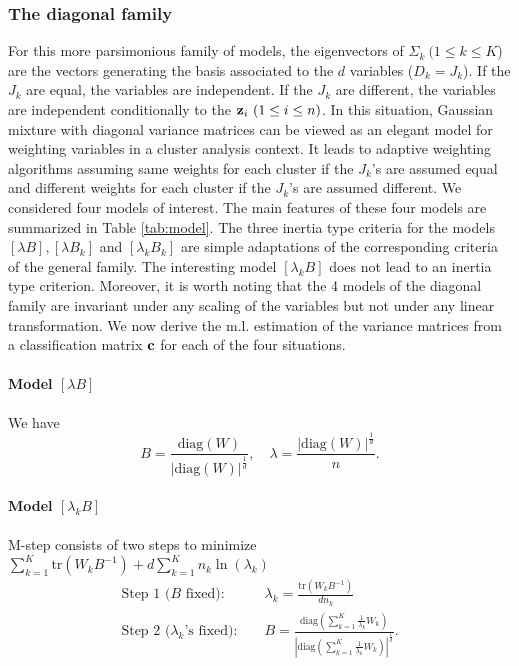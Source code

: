 \documentclass[12pt]{article}
\begin{document}
\subsubsection{The diagonal family}
For this more parsimonious family of models, the eigenvectors of $\Sigma_{k}\ (1 \leq k \leq
K$) are the vectors generating the basis associated to the $d$ variables ($D_k=J_k$).  If the
$J_k$ are equal, the variables are independent. If the $J_k$ are different, the variables are
independent conditionally to the ${\bf z}_{i} \ (1 \leq i \leq n)$.  In this situation,
Gaussian mixture with diagonal variance matrices can be viewed as an elegant model for
weighting variables in a cluster analysis context.  It leads to adaptive weighting algorithms
assuming same weights for each cluster if the $J_k$'s are assumed equal and different weights
for each cluster if the $J_k$'s are assumed different. We considered four models of interest.
The main features of these four models are summarized in Table \ref{tab:model}. The three
inertia type criteria for the models $[\lambda B], [\lambda B_k]$ and $[\lambda_k B_k]$ are
simple adaptations of the corresponding criteria of the general family.  The interesting model
$[\lambda_kB]$ does not lead to an inertia type criterion. Moreover, it is worth noting that
the 4 models of the diagonal family are invariant under any scaling of the variables but not
under any linear transformation. We now derive the m.l. estimation of the variance matrices from
a classification matrix ${\bf c}$ for each of the four situations.

\paragraph{Model $[\lambda B]$}
We have
\begin{equation}
  B=\frac{\mbox{diag}(W)} {|\mbox{diag}(W)|^{\frac{1}{d}}}, \quad
  \lambda=\frac {|\mbox{diag}(W)|^{\frac{1}{d}}}{n}.
\end{equation}

\paragraph{Model $[\lambda_k B]$}
M-step consists of two steps to minimize $\sum_{k=1}^{K} \mbox{tr} (W_k
B^{-1}) + d \sum_{k=1}^{K} n_k \ln(\lambda_k)$
\begin{eqnarray}
  \mbox{Step 1 ($B$ fixed): } & & \lambda_k=\frac{\mbox{tr}(W_kB^{-1})}{dn_{k}} \\
  \mbox{Step 2 ($\lambda_k$'s fixed): } & &
  B=\frac{\mbox{diag}\left(\sum_{k=1}^K \frac{1}{\lambda_k}W_k
    \right)}{|\mbox{diag}\left(\sum_{k=1}^K
      \frac{1}{\lambda_k}W_k\right)|^{\frac{1}{d}}}.
\end{eqnarray}
\end{document}
